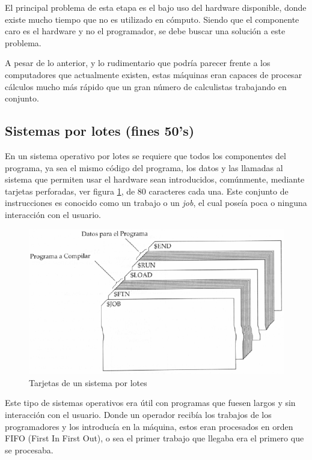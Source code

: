 El principal problema de esta etapa es el bajo uso del hardware disponible,
donde existe mucho tiempo que no es utilizado en cómputo. Siendo que el
componente caro es el hardware y no el programador, se debe buscar una solución
a este problema.

A pesar de lo anterior, y lo rudimentario que podría parecer frente a los
computadores que actualmente existen, estas máquinas eran capaces de procesar
cálculos mucho más rápido que un gran número de calculistas trabajando en
conjunto.

\subsection{Sistemas por lotes (fines 50's)}
En un sistema operativo por lotes se requiere que todos los componentes del
programa, ya sea el mismo código del programa, los datos y las llamadas al
sistema que permiten usar el hardware sean introducidos, comúnmente, mediante
tarjetas perforadas, ver figura \ref{fig:lotes}, de 80 caracteres cada una. Este
conjunto de instrucciones es conocido como un trabajo o un \textit{job}, el cual
poseía poca o ninguna interacción con el usuario.

\begin{figure}[htbp]
\centering
\includegraphics[scale=.7]{img/C02_historia/lotes.png}
\caption{Tarjetas de un sistema por lotes}
\label{fig:lotes}
\end{figure}

Este tipo de sistemas operativos era útil con programas que fuesen largos y sin
interacción con el usuario. Donde un operador recibía los trabajos de los
programadores y los introducía en la máquina, estos eran procesados en orden
FIFO (First In First Out), o sea el primer trabajo que llegaba era el primero
que se procesaba.

